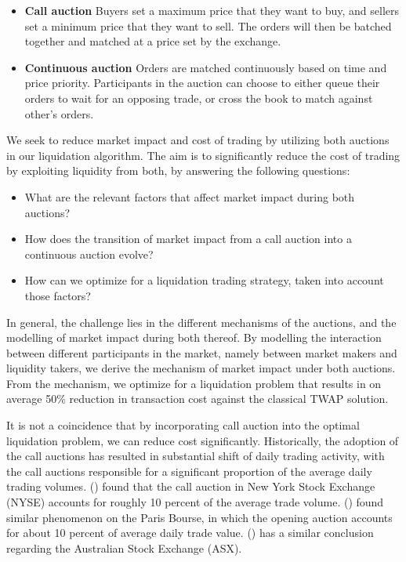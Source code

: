 \documentclass{article}
\begin{document}
\begin{itemize}
  \item \textbf{Call auction} Buyers set a maximum price that they want to buy, and sellers set a minimum price that they want to sell. The orders will then be batched together and matched at a price set by the exchange.
  \item \textbf{Continuous auction} Orders are matched continuously based on time and price priority. Participants in the auction can choose to either queue their orders to wait for an opposing trade, or cross the book to match against other's orders.
\end{itemize}

We seek to reduce market impact and cost of trading by utilizing both auctions in our liquidation algorithm. The aim is to significantly reduce the cost of trading by exploiting liquidity from both, by answering the following questions:

\begin{itemize}
  \item What are the relevant factors that affect market impact during both auctions?
  \item How does the transition of market impact from a call auction into a continuous auction evolve?
  \item How can we optimize for a liquidation trading strategy, taken into account those factors?
\end{itemize}

In general, the challenge lies in the different mechanisms of the auctions, and the modelling of market impact during both thereof. By modelling the interaction between different participants in the market, namely between market makers and liquidity takers, we derive the mechanism of market impact under both auctions. From the mechanism, we optimize for a liquidation problem that results in on average 50\% reduction in transaction cost against the classical TWAP solution.

It is not a coincidence that by incorporating call auction into the optimal liquidation problem, we can reduce cost significantly. Historically, the adoption of the call auctions has resulted in substantial shift of daily trading activity, with the call auctions responsible for a significant proportion of the average daily trading volumes. (\cite{Madhavan2015}) found that the call auction in New York Stock Exchange (NYSE) accounts for roughly 10 percent of the average trade volume. (\cite{Bruno1999}) found similar phenomenon on the Paris Bourse, in which the opening auction accounts for about 10 percent of average daily trade value. (\cite{Carole2006}) has a similar conclusion regarding the Australian Stock Exchange (ASX).
\end{document}
